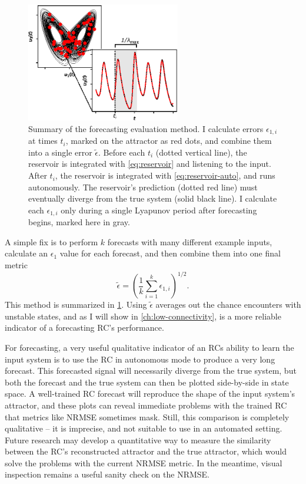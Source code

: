 \begin{figure}
  \includegraphics[width=0.6\textwidth]{figures/nrmse-avg}
  \caption{Summary of the forecasting evaluation method. I calculate
    errors $\epsilon_{1,i}$ at times $t_i$, marked on the attractor as
    red dots, and combine them into a single error
    $\tilde{\epsilon}$. Before each $t_i$ (dotted vertical line), the
    reservoir is integrated with \cref{eq:reservoir} and listening to
    the input. After $t_i$, the reservoir is integrated with
    \cref{eq:reservoir-auto}, and runs autonomously. The reservoir's
    prediction (dotted red line) must eventually diverge from the true
    system (solid black line). I calculate each $\epsilon_{1,i}$ only
    during a single Lyapunov period after forecasting begins, marked
    here in gray.}%
  \label{fig:nrmse-avg}
\end{figure}

A simple fix is to perform $k$ forecasts with many different example
inputs, calculate an $\epsilon_1$ value for each forecast, and then
combine them into one final metric
\begin{equation}
  \label{eq:nrmse-avg}
  \tilde{\epsilon} = {\left( \frac{1}{k} \sum_{i=1}^k \epsilon_{1,i} \right)}^{1/2}.
\end{equation}
This method is summarized in \cref{fig:nrmse-avg}.
Using $\tilde{\epsilon}$ averages out the chance encounters with
unstable states, and as I will show in \cref{ch:low-connectivity}, is
a more reliable indicator of a forecasting RC's performance.

For forecasting, a very useful qualitative indicator of an RCs ability
to learn the input system is to use the RC in autonomous mode to
produce a very long forecast. This forecasted signal will necessarily
diverge from the true system, but both the forecast and the true
system can then be plotted side-by-side in state space. A well-trained
RC forecast will reproduce the shape of the input system's attractor,
and these plots can reveal immediate problems with the trained RC that
metrics like NRMSE sometimes mask. Still, this comparison is
completely qualitative -- it is imprecise, and not suitable to use in
an automated setting. Future research may develop a quantitative way
to measure the similarity between the RC's reconstructed attractor and
the true attractor, which would solve the problems with the current
NRMSE metric. In the meantime, visual inspection remains a useful
sanity check on the NRMSE.

